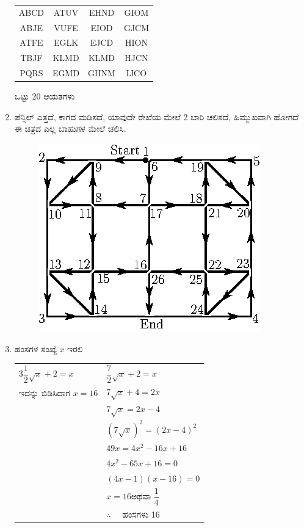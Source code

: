 \begin{enumerate}
\begin{tabular}[c]{cccc}
ABCD & ATUV & EHND & GIOM\\
ABJE & VUFE & EIOD & GJCM\\
ATFE & EGLK & EJCD & HION\\
TBJF & KLMD & KLMD & HJCN\\
PQRS & EGMD & GHNM & IJCO\\
\end{tabular}

ಒಟ್ಟು 20 ಆಯತಗಳು 

\item ಪೆನ್ಸಿಲ್ ಎತ್ತದೆ, ಕಾಗದ ಮಡಿಸದೆ, ಯಾವುದೇ ರೇಖೆಯ ಮೇಲೆ 2 ಬಾರಿ ಚಲಿಸದೆ, ಹಿಮ್ಮುಖವಾಗಿ ಹೋಗದೆ ಈ ಚಿತ್ರದ ಎಲ್ಲ ಬಾಹುಗಳ ಮೇಲೆ ಚಲಿಸಿ. 

\begin{figure}[H]
\centering
\includegraphics{images/chap6/ans16.eps}
\end{figure}

\item ಹಂಸಗಳ ಸಂಖ್ಯೆ $x$ ಇರಲಿ 

\begin{tabular}{l|l}
$3\dfrac{1}{2} \sqrt{x} + 2 = x$ & $\dfrac{7}{2} \sqrt{x} + 2 = x$\\
ಇದನ್ನು ಬಿಡಿಸಿದಾಗ $x = 16$ & $7\sqrt{x} + 4 = 2x$\\
& $7\sqrt{x} = 2x - 4$\\
& $(7\sqrt{x})^{2} = (2x - 4)^{2}$\\
& $49x = 4x^{2} - 16x + 16$\\
& $4x^{2} - 65x + 16 = 0$\\
& $(4x - 1) (x - 16) = 0$\\
& $x= 16$\quad ಅಥವಾ \quad $\dfrac{1}{4}$\\
& $\therefore\quad$ ಹಂಸಗಳು 16
\end{tabular}


\end{enumerate}

